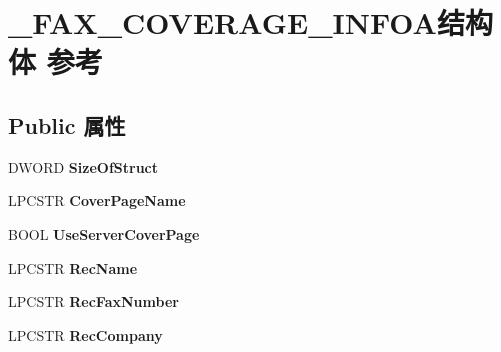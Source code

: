 \hypertarget{struct___f_a_x___c_o_v_e_r_a_g_e___i_n_f_o_a}{}\section{\+\_\+\+F\+A\+X\+\_\+\+C\+O\+V\+E\+R\+A\+G\+E\+\_\+\+I\+N\+F\+O\+A结构体 参考}
\label{struct___f_a_x___c_o_v_e_r_a_g_e___i_n_f_o_a}
\subsection*{Public 属性}
\begin{DoxyCompactItemize}
\item 
\mbox{\label{struct___f_a_x___c_o_v_e_r_a_g_e___i_n_f_o_a_a0755ecfe1a1c12d037b1fa9b9cdf4296}} 
D\+W\+O\+RD {\bfseries Size\+Of\+Struct}
\item 
\mbox{\label{struct___f_a_x___c_o_v_e_r_a_g_e___i_n_f_o_a_aa73459afa83f68f061698aaba04eac72}} 
L\+P\+C\+S\+TR {\bfseries Cover\+Page\+Name}
\item 
\mbox{\label{struct___f_a_x___c_o_v_e_r_a_g_e___i_n_f_o_a_aea9199062649b8e5ee6e1d2344b3957d}} 
B\+O\+OL {\bfseries Use\+Server\+Cover\+Page}
\item 
\mbox{\label{struct___f_a_x___c_o_v_e_r_a_g_e___i_n_f_o_a_a8c881aab8d2ad353fa8e36abab79db82}} 
L\+P\+C\+S\+TR {\bfseries Rec\+Name}
\item 
\mbox{\label{struct___f_a_x___c_o_v_e_r_a_g_e___i_n_f_o_a_abc0752195dfa1f37d7241b5eeec9e301}} 
L\+P\+C\+S\+TR {\bfseries Rec\+Fax\+Number}
\item 
\mbox{\label{struct___f_a_x___c_o_v_e_r_a_g_e___i_n_f_o_a_a53da3b9305096ce720d95ccaf72cd11e}} 
L\+P\+C\+S\+TR {\bfseries Rec\+Company}
\item 
\mbox{\label{struct___f_a_x___c_o_v_e_r_a_g_e___i_n_f_o_a_ac7cd4d80372e2ffb236aa2dd310a8326}} 

\end{DoxyCompactItemize}
